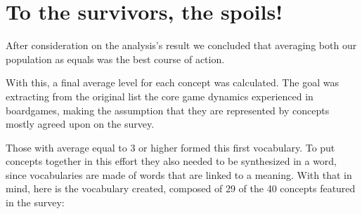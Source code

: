 \section{To the survivors, the spoils!}

After consideration on the analysis's result we concluded that averaging both our population as equals was the best course of action.

With this, a final average level for each concept was calculated. The goal was  extracting from the original list the core game dynamics experienced in boardgames, making the assumption that they are represented by concepts mostly agreed upon on the survey. 

Those with average equal to 3 or higher formed this first vocabulary. To put concepts together in this effort they also needed to be synthesized in a word, since vocabularies are made of words that are linked to a meaning. With that in mind, here is the vocabulary created, composed of 29 of the 40 concepts featured in the survey:

